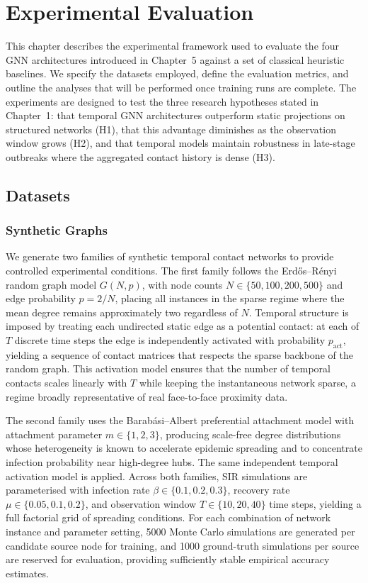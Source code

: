 \chapter{Experimental Evaluation}
\label{c:chapter4}

This chapter describes the experimental framework used to evaluate the four GNN architectures introduced in Chapter~5 against a set of classical heuristic baselines. We specify the datasets employed, define the evaluation metrics, and outline the analyses that will be performed once training runs are complete. The experiments are designed to test the three research hypotheses stated in Chapter~1: that temporal GNN architectures outperform static projections on structured networks (H1), that this advantage diminishes as the observation window grows (H2), and that temporal models maintain robustness in late-stage outbreaks where the aggregated contact history is dense (H3).

\section{Datasets}
\label{st:datasets}

\subsection{Synthetic Graphs}
\label{ssst:synthetic}

We generate two families of synthetic temporal contact networks to provide controlled experimental conditions. The first family follows the Erd\H{o}s--R\'enyi random graph model $G(N, p)$, with node counts $N \in \{50, 100, 200, 500\}$ and edge probability $p = 2/N$, placing all instances in the sparse regime where the mean degree remains approximately two regardless of $N$. Temporal structure is imposed by treating each undirected static edge as a potential contact: at each of $T$ discrete time steps the edge is independently activated with probability $p_{\mathrm{act}}$, yielding a sequence of contact matrices that respects the sparse backbone of the random graph. This activation model ensures that the number of temporal contacts scales linearly with $T$ while keeping the instantaneous network sparse, a regime broadly representative of real face-to-face proximity data.

The second family uses the Barab\'asi--Albert preferential attachment model with attachment parameter $m \in \{1, 2, 3\}$, producing scale-free degree distributions whose heterogeneity is known to accelerate epidemic spreading and to concentrate infection probability near high-degree hubs. The same independent temporal activation model is applied. Across both families, SIR simulations are parameterised with infection rate $\beta \in \{0.1, 0.2, 0.3\}$, recovery rate $\mu \in \{0.05, 0.1, 0.2\}$, and observation window $T \in \{10, 20, 40\}$ time steps, yielding a full factorial grid of spreading conditions. For each combination of network instance and parameter setting, 5000 Monte Carlo simulations are generated per candidate source node for training, and 1000 ground-truth simulations per source are reserved for evaluation, providing sufficiently stable empirical accuracy estimates.

